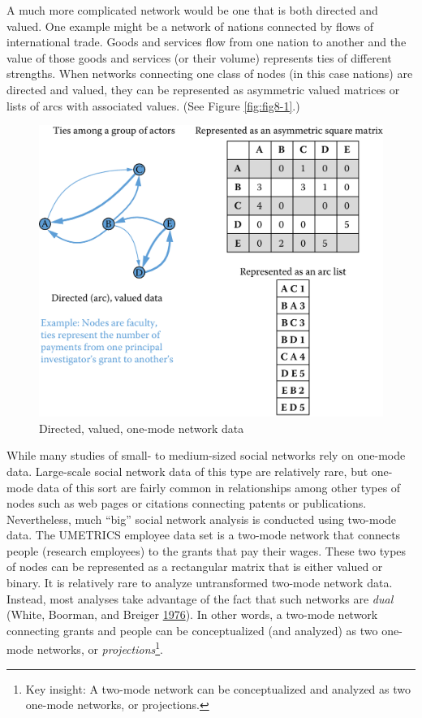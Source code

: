 \documentclass[]{krantz}
\begin{document}
\vspace*{-12pt} A much more complicated network would be one that is
both directed and valued. One example might be a network of nations
connected by flows of international trade. Goods and services flow from
one nation to another and the value of those goods and services (or
their volume) represents ties of different strengths. When networks
connecting one class of nodes (in this case nations) are directed and
valued, they can be represented as asymmetric valued matrices or lists
of arcs with associated values. (See Figure \ref{fig:fig8-1}.)

\begin{figure}

{\centering \includegraphics[width=0.7\linewidth]{ChapterNetworks/figures/fig8-2} 

}

\caption{Directed, valued, one-mode network data}\label{fig:fig8-2}
\end{figure}

\vspace*{-12pt} While many studies of small- to medium-sized social
networks rely on one-mode data. Large-scale social network data of this
type are relatively rare, but one-mode data of this sort are fairly
common in relationships among other types of nodes such as web pages or
citations connecting patents or publications. Nevertheless, much ``big''
social network analysis is conducted using two-mode data. The UMETRICS
employee data set is a two-mode network that connects people (research
employees) to the grants that pay their wages. These two types of nodes
can be represented as a rectangular matrix that is either valued or
binary. It is relatively rare to analyze untransformed two-mode network
data. Instead, most analyses take advantage of the fact that such
networks are \emph{dual} (White, Boorman, and Breiger
\protect\hyperlink{ref-white1976social}{1976}). In other words, a
two-mode network connecting grants and people can be conceptualized (and
analyzed) as two one-mode networks, or \emph{projections}\footnote{Key
  insight: A two-mode network can be conceptualized and analyzed as two
  one-mode networks, or projections.}.
\end{document}
